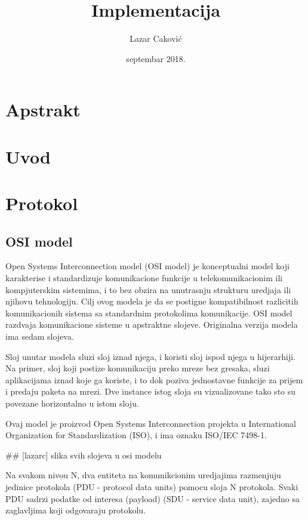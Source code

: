 \documentclass[a4paper,12pt, master]{etf}
\title{Implementacija}
\author{Lazar Caković}
\date{septembar 2018.}
\begin{document}
	\maketitle

	\tableofcontents

	\listoffigures

	\newpage

	\chapter{Apstrakt}

	\newpage

	\chapter{Uvod}

	\newpage

	\chapter{Protokol}

	\section{OSI model}

	Open Systems Interconnection model (OSI model) je konceptualni model koji karakterise i
	standardizuje komunikacione funkcije u telekomunikacionim ili kompjuterskim sistemima, i 
	to bez obzira na unutrasnju strukturu uredjaja ili njihovu tehnologiju. Cilj ovog modela 
	je da se postigne kompatibilnost razlicitih komunikacionih sistema sa standardnim 
	protokolima komunikacije. OSI model razdvaja komunikacione sisteme u apstraktne slojeve. 
	Originalna verzija modela ima sedam slojeva.

	Sloj unutar modela sluzi sloj iznad njega, i koristi sloj ispod njega u hijerarhiji. Na 
	primer, sloj koji postize komunikaciju preko mreze bez gresaka, sluzi aplikacijama iznad 
	koje ga koriste, i to dok poziva jednostavne funkcije za prijem i predaju paketa na mrezi. 
	Dve instance istog sloja su vizualizovane tako sto su povezane horizontalno u istom sloju.

	Ovaj model je proizvod Open Systems Interconnection projekta u International Organization 
	for Standardization (ISO), i ima oznaku ISO/IEC 7498-1.

	\#\# [lazarc] slika svih slojeva u osi modelu

	Na svakom nivou N, dva entiteta na komunikcionim uredjajima razmenjuju jedinice protokola 
	(PDU - protocol data units) pomocu sloja N protokola. Svaki PDU sadrzi podatke od interesa 
	(payload) (SDU - service data unit), zajedno sa zaglavljima koji odgovaraju protokolu.
\end{document}
